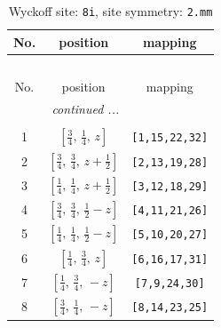 \documentclass[fleqn,8pt]{jsarticle}
\begin{document}
\begin{longtable}{ccc}
\caption{Wyckoff site: {\tt 8i}, site symmetry: {\tt 2.mm}}
 \\
 \hline \hline
No. & position & mapping \\ \hline \endfirsthead

\multicolumn{2}{l}{\tablename\ \thetable{}} \\
 \hline \hline
No. & position & mapping \\ \hline \endhead

 \hline \hline
\multicolumn{2}{r}{\footnotesize\it continued ...} \\ \endfoot

 \hline \hline
\multicolumn{2}{r}{} \\ \endlastfoot

1 & $\left[ \frac{3}{4},\, \frac{1}{4},\, z \right]$ & {\tt [1,15,22,32]} \\ \hline
2 & $\left[ \frac{3}{4},\, \frac{3}{4},\, z + \frac{1}{2} \right]$ & {\tt [2,13,19,28]} \\ \hline
3 & $\left[ \frac{1}{4},\, \frac{1}{4},\, z + \frac{1}{2} \right]$ & {\tt [3,12,18,29]} \\ \hline
4 & $\left[ \frac{3}{4},\, \frac{3}{4},\, \frac{1}{2} - z \right]$ & {\tt [4,11,21,26]} \\ \hline
5 & $\left[ \frac{1}{4},\, \frac{1}{4},\, \frac{1}{2} - z \right]$ & {\tt [5,10,20,27]} \\ \hline
6 & $\left[ \frac{1}{4},\, \frac{3}{4},\, z \right]$ & {\tt [6,16,17,31]} \\ \hline
7 & $\left[ \frac{1}{4},\, \frac{3}{4},\, - z \right]$ & {\tt [7,9,24,30]} \\ \hline
8 & $\left[ \frac{3}{4},\, \frac{1}{4},\, - z \right]$ & {\tt [8,14,23,25]} \\
\end{longtable}
\renewcommand{\arraystretch}{1.2}
\end{document}
